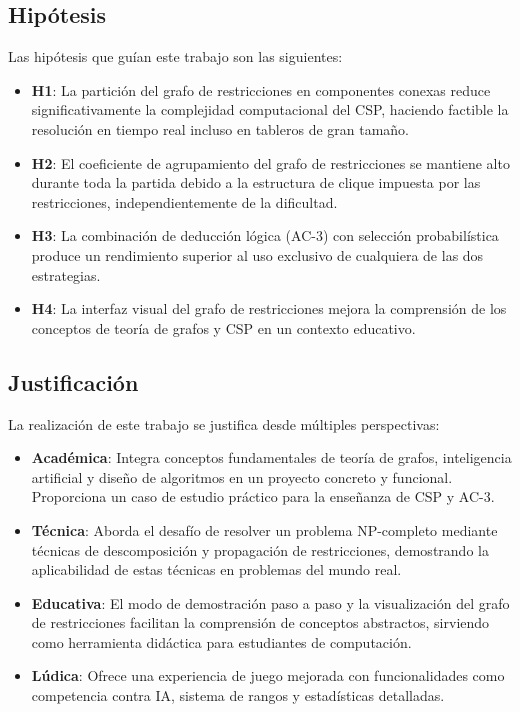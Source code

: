 \documentclass[12pt,a4paper]{article}
\begin{document}
\subsection{Hipótesis}

Las hipótesis que guían este trabajo son las siguientes:

\begin{itemize}[itemsep=2pt]
    \item \textbf{H1}: La partición del grafo de restricciones en componentes conexas reduce significativamente la complejidad computacional del CSP, haciendo factible la resolución en tiempo real incluso en tableros de gran tamaño.

    \item \textbf{H2}: El coeficiente de agrupamiento del grafo de restricciones se mantiene alto durante toda la partida debido a la estructura de clique impuesta por las restricciones, independientemente de la dificultad.

    \item \textbf{H3}: La combinación de deducción lógica (AC-3) con selección probabilística produce un rendimiento superior al uso exclusivo de cualquiera de las dos estrategias.

    \item \textbf{H4}: La interfaz visual del grafo de restricciones mejora la comprensión de los conceptos de teoría de grafos y CSP en un contexto educativo.
\end{itemize}

\subsection{Justificación}

La realización de este trabajo se justifica desde múltiples perspectivas:

\begin{itemize}[itemsep=2pt]
    \item \textbf{Académica}: Integra conceptos fundamentales de teoría de grafos, inteligencia artificial y diseño de algoritmos en un proyecto concreto y funcional. Proporciona un caso de estudio práctico para la enseñanza de CSP y AC-3.

    \item \textbf{Técnica}: Aborda el desafío de resolver un problema NP-completo mediante técnicas de descomposición y propagación de restricciones, demostrando la aplicabilidad de estas técnicas en problemas del mundo real.

    \item \textbf{Educativa}: El modo de demostración paso a paso y la visualización del grafo de restricciones facilitan la comprensión de conceptos abstractos, sirviendo como herramienta didáctica para estudiantes de computación.

    \item \textbf{Lúdica}: Ofrece una experiencia de juego mejorada con funcionalidades como competencia contra IA, sistema de rangos y estadísticas detalladas.
\end{itemize}
\end{document}
